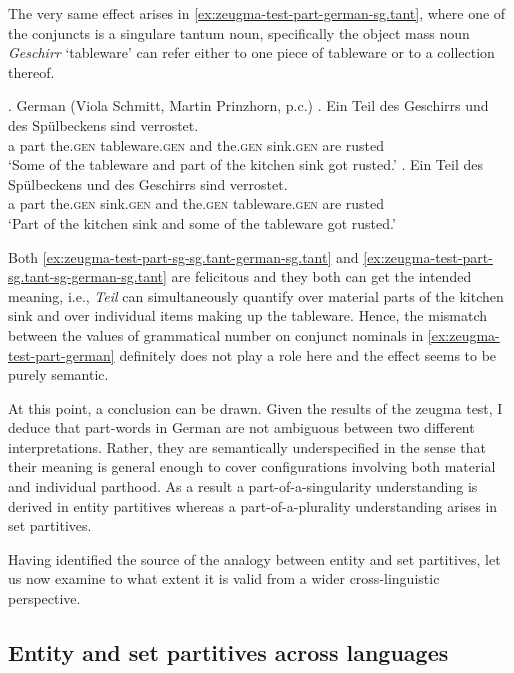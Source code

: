 The very same effect arises in \ref{ex:zeugma-test-part-german-sg.tant}, where one of the conjuncts is a singulare tantum noun, specifically the object mass noun \textit{Geschirr} `tableware' can refer either to one piece of tableware or to a collection thereof. 

\ex.\label{ex:zeugma-test-part-german-sg.tant} German (Viola Schmitt, Martin Prinzhorn, p.c.)
\ag. Ein Teil des Geschirrs und des Spülbeckens sind verrostet.\label{ex:zeugma-test-part-sg-sg.tant-german-sg.tant}\\
a part the\textsc{.gen} tableware\textsc{.gen} and the\textsc{.gen} sink\textsc{.gen} are rusted\\
`Some of the tableware and part of the kitchen sink got rusted.'
\bg. Ein Teil des Spülbeckens und des Geschirrs sind verrostet.\label{ex:zeugma-test-part-sg.tant-sg-german-sg.tant}\\
a part the\textsc{.gen} sink\textsc{.gen} and the\textsc{.gen} tableware\textsc{.gen} are rusted\\
`Part of the kitchen sink and some of the tableware got rusted.'

Both \ref{ex:zeugma-test-part-sg-sg.tant-german-sg.tant} and \ref{ex:zeugma-test-part-sg.tant-sg-german-sg.tant} are felicitous and they both can get the intended meaning, i.e., \textit{Teil} can simultaneously quantify over material parts of the kitchen sink and over individual items making up the tableware. Hence, the mismatch between the values of grammatical number on conjunct nominals in \ref{ex:zeugma-test-part-german} definitely does not play a role here and the effect seems to be purely semantic.\largerpage

At this point, a conclusion can be drawn. Given the results of the zeugma test, I deduce that part-words in German are not ambiguous between two different interpretations. Rather, they are semantically underspecified in the sense that their meaning is general enough to cover configurations involving both material and individual parthood. As a result a part-of-a-singularity understanding is derived in entity partitives whereas a part-of-a-plurality understanding arises in set partitives.

Having identified the source of the analogy between entity and set partitives, let us now examine to what extent it is valid from a wider cross-linguistic perspective.

\subsection{Entity and set partitives across languages}\label{sec:entity-and-set-partitives-across-languages}

